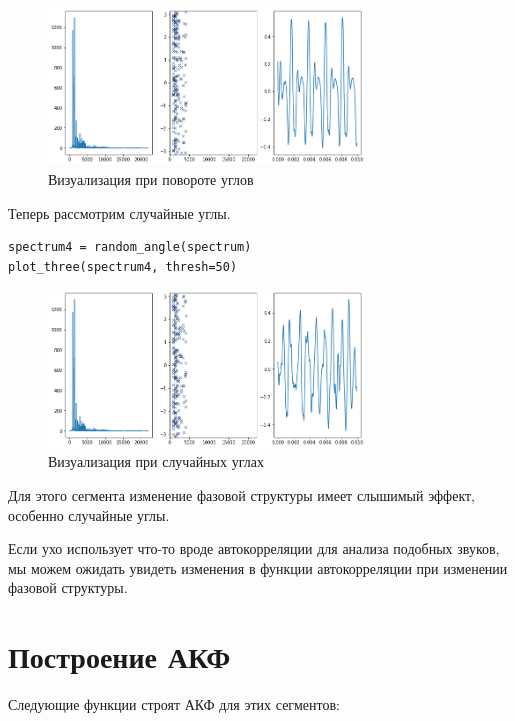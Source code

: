 \documentclass[a4paper,12pt]{report}
\begin{document}
\begin{figure}[H]
        \centering
        \includegraphics[width=0.75\textwidth]{lab6_fig3_20.png}
        \caption{Визуализация при повороте углов}
        \label{fig:lab6_fig3_20}
\end{figure}

Теперь рассмотрим случайные углы.

\begin{lstlisting}[caption=Визуализация при случайных углах]
spectrum4 = random_angle(spectrum)
plot_three(spectrum4, thresh=50)
\end{lstlisting}

\begin{figure}[H]
        \centering
        \includegraphics[width=0.75\textwidth]{lab6_fig3_21.png}
        \caption{Визуализация при случайных углах}
        \label{fig:lab6_fig3_21}
\end{figure}

Для этого сегмента изменение фазовой структуры имеет слышимый эффект, особенно случайные углы.

Если ухо использует что-то вроде автокорреляции для анализа подобных звуков, мы можем ожидать увидеть изменения в функции автокорреляции при изменении фазовой структуры.

\section{Построение АКФ}

Следующие функции строят АКФ для этих сегментов:
\end{document}
